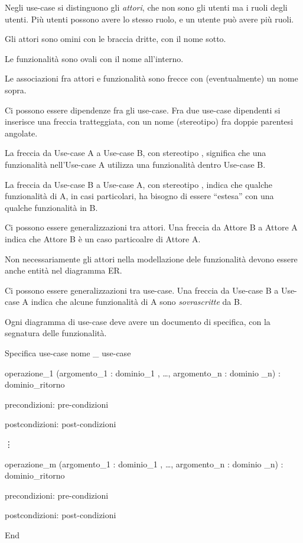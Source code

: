 Negli use-case si distinguono gli \emph{attori}, che non sono gli utenti ma i ruoli degli utenti. Pi\`u utenti possono avere lo stesso ruolo, e un utente pu\`o avere pi\`u ruoli.

Gli attori sono omini con le braccia dritte, con il nome sotto.

Le funzionalit\`a sono ovali con il nome all'interno.

Le associazioni fra attori e funzionalit\`a sono frecce con (eventualmente) un nome sopra.

Ci possono essere dipendenze fra gli use-case. Fra due use-case dipendenti si inserisce una freccia tratteggiata, con un nome (stereotipo) fra doppie parentesi angolate. 

La freccia da Use-case A a Use-case B, con stereotipo , significa che una funzionalit\`a nell'Use-case A utilizza una funzionalit\`a dentro Use-case B.

La freccia da Use-case B a Use-case A, con stereotipo , indica che qualche funzionalit\`a di A, in casi particolari, ha bisogno di essere ``estesa'' con una qualche funzionalit\`a in B.

Ci possono essere generalizzazioni tra attori. Una freccia da Attore B a Attore A indica che Attore B \`e un caso particoalre di Attore A.

Non necessariamente gli attori nella modellazione dele funzionalit\`a devono essere anche entit\`a nel diagramma ER.

Ci possono essere generalizzazioni tra use-case. Una freccia da Use-case B a Use-case A indica che alcune funzionalit\`a di A sono \emph{sovrascritte} da B.

Ogni diagramma di use-case deve avere un documento di specifica, con la segnatura delle funzionalit\`a.

Specifica use-case nome _ use-case

operazione_1 (argomento_1 : dominio_1 , \ldots , argomento_n : dominio _n) : dominio_ritorno

precondizioni: pre-condizioni

postcondizioni: post-condizioni

\vdots

operazione_m (argomento_1 : dominio_1 , \ldots , argomento_n : dominio _n) : dominio_ritorno

precondizioni: pre-condizioni

postcondizioni: post-condizioni

End

